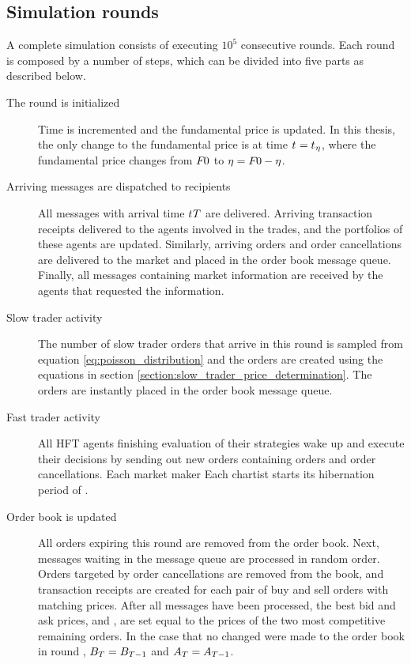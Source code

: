 \subsection{Simulation rounds}
A complete simulation consists of executing $10^5$ consecutive rounds. Each round is composed by a number of steps, which can be divided into five parts as described below.
\begin{description}
\item[The round is initialized] Time is incremented and the fundamental price is updated. In this thesis, the only change to the fundamental price is at time $t_{} = t_{}{_\eta}$, where the fundamental price changes from $F_{}{0}$ to $\eta = F_{}{0} - \eta$.
\item[Arriving messages are dispatched to recipients] All messages with arrival time $t_{}{T}$ are delivered. Arriving transaction receipts delivered to the agents involved in the trades, and the portfolios of these agents are updated. Similarly, arriving orders and order cancellations are delivered to the market and placed in the order book message queue. Finally, all messages containing market information are received by the agents that requested the information. 
\item[Slow trader activity] The number of slow trader orders that arrive in this round is sampled from equation \ref{eq:poisson_distribution} and the orders are created using the equations in section \ref{section:slow_trader_price_determination}. The orders are instantly placed in the order book message queue.
\item[Fast trader activity] All HFT agents finishing evaluation of their strategies wake up and execute their decisions by sending out new orders containing orders and order cancellations. Each market maker  Each chartist  starts its hibernation period of .
\item[Order book is updated] All orders expiring this round are removed from the order book. Next, messages waiting in the message queue are processed in random order. Orders targeted by order cancellations are removed from the book, and transaction receipts are created for each pair of buy and sell orders with matching prices. After all messages have been processed, the best bid and ask prices,  and , are set equal to the prices of the two most competitive remaining orders. In the case that no changed were made to the order book in round , $B_{T} = B_{T-1}$ and $A_{T} = A_{T-1}$.
\end{description}


